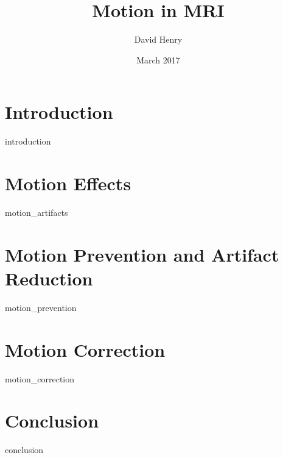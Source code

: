 \documentclass{article}
\title{Motion in MRI}
\author{David Henry}
\date{March 2017}
\begin{document}
\maketitle

\tableofcontents

\section{Introduction} \label{Section1}
{introduction}

\section{Motion Effects} \label{Section2}
{motion_artifacts}

\section{Motion Prevention and Artifact Reduction} \label{Section3}
{motion_prevention}

\section{Motion Correction} \label{Section4}
{motion_correction}

\section{Conclusion} \label{Section5}
{conclusion}

\printbibliography
\end{document}
